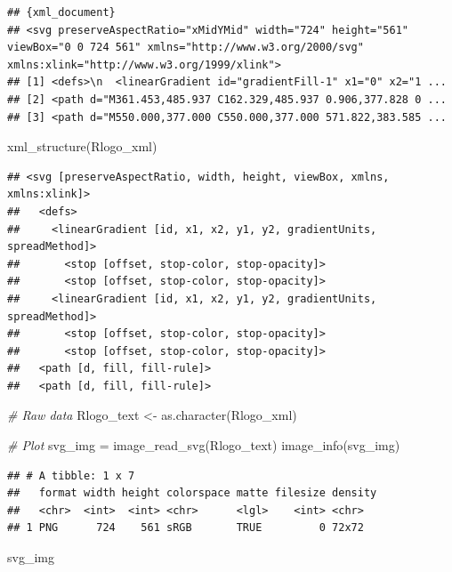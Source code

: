 \documentclass[
  12pt,
]{style/krantz}
\newenvironment{Shaded}{\begin{snugshade}}{\end{snugshade}}
\newcommand{\CommentTok}[1]{\textcolor[rgb]{0.56,0.35,0.01}{\textit{#1}}}
\newcommand{\FunctionTok}[1]{\textcolor[rgb]{0.00,0.00,0.00}{#1}}
\newcommand{\NormalTok}[1]{#1}
\newcommand{\OtherTok}[1]{\textcolor[rgb]{0.56,0.35,0.01}{#1}}
\begin{document}
\begin{verbatim}
## {xml_document}
## <svg preserveAspectRatio="xMidYMid" width="724" height="561" viewBox="0 0 724 561" xmlns="http://www.w3.org/2000/svg" xmlns:xlink="http://www.w3.org/1999/xlink">
## [1] <defs>\n  <linearGradient id="gradientFill-1" x1="0" x2="1 ...
## [2] <path d="M361.453,485.937 C162.329,485.937 0.906,377.828 0 ...
## [3] <path d="M550.000,377.000 C550.000,377.000 571.822,383.585 ...
\end{verbatim}

\begin{Shaded}
\begin{Highlighting}[]
\FunctionTok{xml\_structure}\NormalTok{(Rlogo\_xml)}
\end{Highlighting}
\end{Shaded}

\begin{verbatim}
## <svg [preserveAspectRatio, width, height, viewBox, xmlns, xmlns:xlink]>
##   <defs>
##     <linearGradient [id, x1, x2, y1, y2, gradientUnits, spreadMethod]>
##       <stop [offset, stop-color, stop-opacity]>
##       <stop [offset, stop-color, stop-opacity]>
##     <linearGradient [id, x1, x2, y1, y2, gradientUnits, spreadMethod]>
##       <stop [offset, stop-color, stop-opacity]>
##       <stop [offset, stop-color, stop-opacity]>
##   <path [d, fill, fill-rule]>
##   <path [d, fill, fill-rule]>
\end{verbatim}

\begin{Shaded}
\begin{Highlighting}[]
\CommentTok{\# Raw data}
\NormalTok{Rlogo\_text }\OtherTok{\textless{}{-}} \FunctionTok{as.character}\NormalTok{(Rlogo\_xml)}

\CommentTok{\# Plot}
\NormalTok{svg\_img }\OtherTok{=} \FunctionTok{image\_read\_svg}\NormalTok{(Rlogo\_text)}
\FunctionTok{image\_info}\NormalTok{(svg\_img)}
\end{Highlighting}
\end{Shaded}

\begin{verbatim}
## # A tibble: 1 x 7
##   format width height colorspace matte filesize density
##   <chr>  <int>  <int> <chr>      <lgl>    <int> <chr>  
## 1 PNG      724    561 sRGB       TRUE         0 72x72
\end{verbatim}

\begin{Shaded}
\begin{Highlighting}[]
\NormalTok{svg\_img}
\end{Highlighting}
\end{Shaded}
\end{document}
